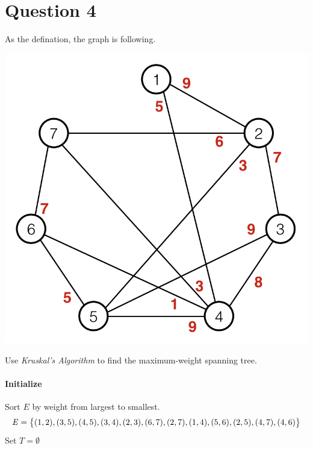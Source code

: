 \documentclass{article}
\begin{document}
\section*{Question 4}{
    As the defination, the graph is following.
    \begin{center}{
        \includegraphics[scale=0.5]{P4.png}
    }
    \end{center}
    Use \textit{Kruskal's Algorithm} to find the maximum-weight spanning tree.

    \paragraph{Initialize}{
        Sort \(\mathit{E}\) by weight from largest to smallest. 
        \[\mathit{E} = \big{\{} (1,2), (3,5), (4,5), (3,4), (2,3), (6,7), (2,7), (1,4), (5,6), (2,5), (4,7), (4,6)\big{\}}\]
        Set \(\mathit{T}=\emptyset\)

}}
\end{document}
